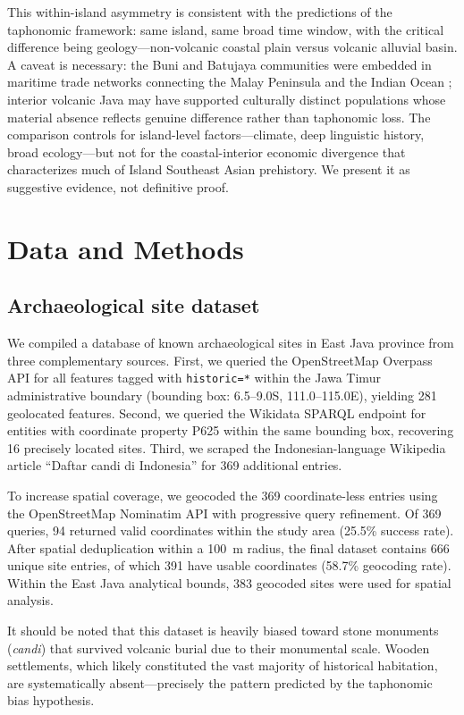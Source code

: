 \documentclass[12pt,a4paper]{article}
\begin{document}
This within-island asymmetry is consistent with the predictions of the taphonomic framework: same island, same broad time window, with the critical difference being geology---non-volcanic coastal plain versus volcanic alluvial basin. A caveat is necessary: the Buni and Batujaya communities were embedded in maritime trade networks connecting the Malay Peninsula and the Indian Ocean \citep{bellina2014,manguin2011}; interior volcanic Java may have supported culturally distinct populations whose material absence reflects genuine difference rather than taphonomic loss. The comparison controls for island-level factors---climate, deep linguistic history, broad ecology---but not for the coastal-interior economic divergence that characterizes much of Island Southeast Asian prehistory. We present it as suggestive evidence, not definitive proof.


\section{Data and Methods}

\subsection{Archaeological site dataset}

We compiled a database of known archaeological sites in East Java province from three complementary sources. First, we queried the OpenStreetMap Overpass API for all features tagged with \texttt{historic=*} within the Jawa Timur administrative boundary (bounding box: 6.5--9.0\textdegree{}S, 111.0--115.0\textdegree{}E), yielding 281 geolocated features. Second, we queried the Wikidata SPARQL endpoint for entities with coordinate property P625 within the same bounding box, recovering 16 precisely located sites. Third, we scraped the Indonesian-language Wikipedia article ``Daftar candi di Indonesia'' for 369 additional entries.

To increase spatial coverage, we geocoded the 369 coordinate-less entries using the OpenStreetMap Nominatim API with progressive query refinement. Of 369 queries, 94 returned valid coordinates within the study area (25.5\% success rate). After spatial deduplication within a 100~m radius, the final dataset contains 666 unique site entries, of which 391 have usable coordinates (58.7\% geocoding rate). Within the East Java analytical bounds, 383 geocoded sites were used for spatial analysis.

It should be noted that this dataset is heavily biased toward stone monuments (\textit{candi}) that survived volcanic burial due to their monumental scale. Wooden settlements, which likely constituted the vast majority of historical habitation, are systematically absent---precisely the pattern predicted by the taphonomic bias hypothesis.
\end{document}
